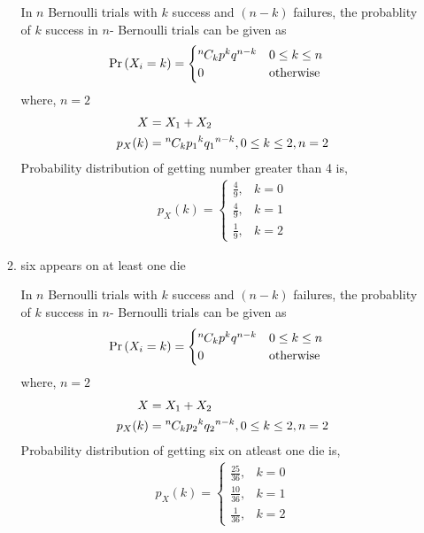 \documentclass{article}
\providecommand{\pr}[1]{\ensuremath{\Pr\left(#1\right)}}
\newcommand*{\permcomb}[4][0mu]{{{}^{#3}\mkern#1#2_{#4}}}
\newcommand*{\comb}[1][-1mu]{\permcomb[#1]{C}}
\begin{document}
\begin{enumerate}[label=13.\arabic{enumi}.\arabic{enumii}]
\begin{enumerate}
In $n$ Bernoulli trials with $k$ success and $(n - k)$ failures, the probablity of $k$ success in $n$- Bernoulli trials can be given as\\
\begin{align}
\pr{X_i=k}  &= 
\begin{cases}
\comb{n}{k} p^{k}q^{n-k} & 0 \le k \le n\\
0 & \text{otherwise}                
\end{cases}
\end{align}
where, $n = 2$
\begin{align}
X&=X_1+X_2\\
p_X(k)&=\comb{n}{k}{p_1}^{k}{q_1}^{n-k}, 0\le k\le 2,n=2
\end{align}
Probability distribution of getting number greater than 4 is,
\begin{align}
  p_X(k) =
    \begin{cases}
      \frac{4}{9}, &  k = 0\\
      \frac{4}{9}, & k = 1\\
      \frac{1}{9}, & k = 2
    \end{cases}       
\end{align}
\item six appears on at least one die

In $n$ Bernoulli trials with $k$ success and $(n - k)$ failures, the probablity of $k$ success in $n$- Bernoulli trials can be given as\\
\begin{align}
\pr{X_i=k}  &= 
\begin{cases}
\comb{n}{k} p^{k}q^{n-k} & 0 \le k \le n\\
0 & \text{otherwise}                
\end{cases}
\end{align}
where, $n = 2$
\begin{align}
X&=X_1+X_2\\
p_X(k)&=\comb{n}{k}{p_2}^{k}{q_2}^{n-k}, 0\le k\le 2,n=2
\end{align}
Probability distribution of getting six on atleast one die is,
\begin{align}
  p_{X}(k) =
    \begin{cases}
      \frac{25}{36}, &  k = 0\\
      \frac{10}{36}, & k = 1\\
      \frac{1}{36}, & k = 2
    \end{cases}       
\end{align}
\end{enumerate}
\end{enumerate}
\end{document}
